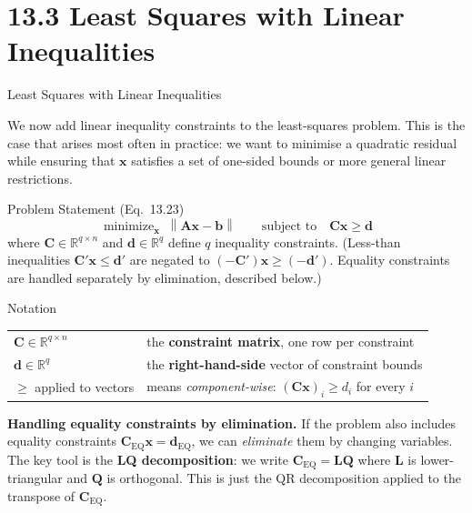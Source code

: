 \documentclass[aspectratio=169,10pt]{beamer}
\DeclareMathOperator*{\minimize}{minimize}
\newcommand{\bx}{\mathbf{x}}
\newcommand{\bb}{\mathbf{b}}
\newcommand{\bA}{\mathbf{A}}
\newcommand{\bC}{\mathbf{C}}
\newcommand{\bd}{\mathbf{d}}
\newcommand{\R}{\mathbb{R}}
\newcommand{\norm}[1]{\left\|#1\right\|}
\begin{document}
\section{13.3 Least Squares with Linear Inequalities}

\begin{frame}[allowframebreaks]{Least Squares with Linear Inequalities}

  We now add linear inequality constraints to the least-squares problem.
  This is the case that arises most often in practice: we want to minimise
  a quadratic residual while ensuring that $\bx$ satisfies a set of one-sided
  bounds or more general linear restrictions.

  \begin{block}{Problem Statement (Eq.~13.23)}
    \[
      \minimize_{\bx}\; \norm{\bA\bx - \bb}
      \qquad \text{subject to}\quad \bC\bx \geq \bd
    \]
    where $\bC \in \R^{q\times n}$ and $\bd \in \R^q$ define $q$ inequality constraints.
    (Less-than inequalities $\bC'\bx \leq \bd'$ are negated to $(-\bC')\bx \geq (-\bd')$.
    Equality constraints are handled separately by elimination, described below.)
  \end{block}

  \begin{block}{Notation}
    \begin{tabular}{ll}
      $\bC \in \R^{q\times n}$ & the \textbf{constraint matrix}, one row per constraint\\
      $\bd \in \R^q$           & the \textbf{right-hand-side} vector of constraint bounds\\
      $\geq$ applied to vectors & means \emph{component-wise}: $(\bC\bx)_i \geq d_i$ for every $i$\\
    \end{tabular}
  \end{block}

  \framebreak

  \textbf{Handling equality constraints by elimination.}  If the problem also
  includes equality constraints $\bC_{\text{EQ}}\bx = \bd_{\text{EQ}}$, we can
  \emph{eliminate} them by changing variables.  The key tool is the
  \textbf{LQ decomposition}: we write $\bC_{\text{EQ}} = \mathbf{L}\mathbf{Q}$
  where $\mathbf{L}$ is lower-triangular and $\mathbf{Q}$ is orthogonal.  This is
  just the QR decomposition applied to the transpose of $\bC_{\text{EQ}}$.


\end{frame}
\end{document}
